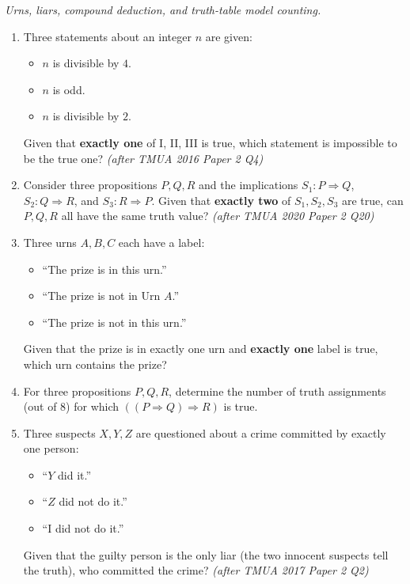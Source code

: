 \documentclass[11pt,a4paper]{article}
\begin{document}
\noindent\textit{Urns, liars, compound deduction, and truth-table model counting.}

\begin{enumerate}

\item Three statements about an integer $n$ are given:
\begin{itemize}
\item[I.] $n$ is divisible by $4$.
\item[II.] $n$ is odd.
\item[III.] $n$ is divisible by $2$.
\end{itemize}
Given that \textbf{exactly one} of I, II, III is true, which statement is impossible to be the true one? \textit{\small(after TMUA 2016 Paper 2 Q4)}

\item Consider three propositions $P, Q, R$ and the implications $S_1: P \Rightarrow Q$, $S_2: Q \Rightarrow R$, and $S_3: R \Rightarrow P$. Given that \textbf{exactly two} of $S_1, S_2, S_3$ are true, can $P, Q, R$ all have the same truth value? \textit{\small(after TMUA 2020 Paper 2 Q20)}

\item Three urns $A, B, C$ each have a label:
\begin{itemize}
\item[Urn $A$:] ``The prize is in this urn.''
\item[Urn $B$:] ``The prize is not in Urn $A$.''
\item[Urn $C$:] ``The prize is not in this urn.''
\end{itemize}
Given that the prize is in exactly one urn and \textbf{exactly one} label is true, which urn contains the prize?

\item For three propositions $P, Q, R$, determine the number of truth assignments (out of $8$) for which $((P \Rightarrow Q) \Rightarrow R)$ is true.

\item Three suspects $X, Y, Z$ are questioned about a crime committed by exactly one person:
\begin{itemize}
\item[$X$:] ``$Y$ did it.''
\item[$Y$:] ``$Z$ did not do it.''
\item[$Z$:] ``I did not do it.''
\end{itemize}
Given that the guilty person is the only liar (the two innocent suspects tell the truth), who committed the crime? \textit{\small(after TMUA 2017 Paper 2 Q2)}


\end{enumerate}
\end{document}
